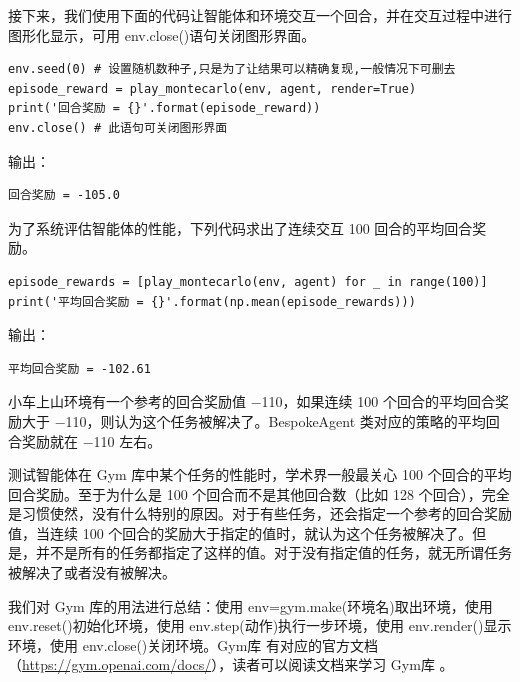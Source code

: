 接下来，我们使用下面的代码让智能体和环境交互一个回合，并在交互过程中进行图形化显示，可用 env.close()语句关闭图形界面。

\begin{lstlisting}[style=Python]
env.seed(0) # 设置随机数种子,只是为了让结果可以精确复现,一般情况下可删去
episode_reward = play_montecarlo(env, agent, render=True)
print('回合奖励 = {}'.format(episode_reward))
env.close() # 此语句可关闭图形界面
\end{lstlisting}

输出：
\begin{lstlisting}[basicstyle=\zihao{-5}\ttfamily]
回合奖励 = -105.0    
\end{lstlisting}



为了系统评估智能体的性能，下列代码求出了连续交互 100 回合的平均回合奖励。
\begin{lstlisting}[style=Python]
episode_rewards = [play_montecarlo(env, agent) for _ in range(100)]
print('平均回合奖励 = {}'.format(np.mean(episode_rewards)))
\end{lstlisting}

输出：
\begin{lstlisting}[basicstyle=\zihao{-5}\ttfamily]
平均回合奖励 = -102.61
\end{lstlisting}

小车上山环境有一个参考的回合奖励值 $-$110，如果连续 100 个回合的平均回合奖励大于 $-$110，则认为这个任务被解决了。BespokeAgent 类对应的策略的平均回合奖励就在 $-$110 左右。

测试智能体在 Gym 库中某个任务的性能时，学术界一般最关心 100 个回合的平均回合奖励。至于为什么是 100 个回合而不是其他回合数（比如 128 个回合），完全是习惯使然，没有什么特别的原因。对于有些任务，还会指定一个参考的回合奖励值，当连续 100 个回合的奖励大于指定的值时，就认为这个任务被解决了。但是，并不是所有的任务都指定了这样的值。对于没有指定值的任务，就无所谓任务被解决了或者没有被解决。

我们对 Gym 库的用法进行总结：使用 env=gym.make(环境名)取出环境，使用 env.reset()初始化环境，使用 env.step(动作)执行一步环境，使用 env.render()显示环境，使用 env.close()关闭环境。Gym库 有对应的官方文档（\url{https://gym.openai.com/docs/}），读者可以阅读文档来学习 Gym库 。






